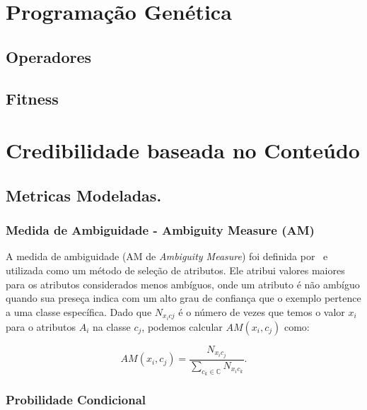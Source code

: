 
\section{Programação Genética}

\subsection{Operadores}

\subsection{Fitness}


\section{Credibilidade baseada no Conteúdo}
\label{sec::pg_cred_baseada_conteudo}

\subsection{Metricas Modeladas.}
\label{subsec::pg_metricas_conteudo}


\subsubsection{Medida de Ambiguidade - Ambiguity Measure (AM)}
\label{subsubsection::am}

A medida de ambiguidade (AM de \textit{Ambiguity Measure}) foi definida por~\cite{Mengle08} e utilizada como um método de seleção de atributos. Ele atribui valores maiores para os atributos considerados menos ambíguos, onde um atributo é não ambíguo quando sua preseça indica com um alto grau de confiança que o exemplo pertence a uma classe específica. Dado que $N_{x_{i}c{j}}$ é o número de vezes que temos o valor $x_i$ para o atributos $A_i$ na classe $c_j$, podemos calcular $AM(x_i, c_j)$ como:

\begin{equation}\label{eqn::am}
   AM(x_i, c_j) = \frac{ N_{x_{i}c_{j}}}{\sum_{c_k \in \mathbb{C}} N_{x_{i}c_{k}}}.
\end{equation}

\subsubsection{Probilidade Condicional}
\label{subsubsection::pc}

